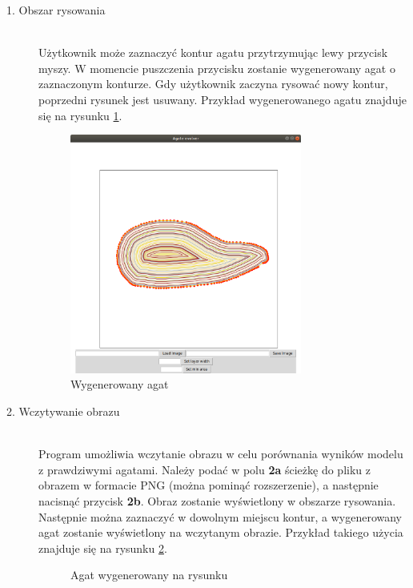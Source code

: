 \documentclass{article}
\begin{document}
\begin{description}
\item[1. Obszar rysowania] \hfill \\
Użytkownik może zaznaczyć kontur agatu przytrzymując lewy przycisk myszy. W momencie puszczenia przycisku zostanie wygenerowany agat o zaznaczonym konturze. Gdy użytkownik zaczyna rysować nowy kontur, poprzedni rysunek jest usuwany. Przykład wygenerowanego agatu znajduje się na rysunku \ref{wygenerowany_agat}.
\begin{figure}[H]
\caption{Wygenerowany agat}
\label{wygenerowany_agat}
\centering
\includegraphics[width=0.75\textwidth]{obrazy/wygenerowany_agat.png}
\end{figure}
\item[2. Wczytywanie obrazu] \hfill \\
Program umożliwia wczytanie obrazu w celu porównania wyników modelu z prawdziwymi agatami. Należy podać w polu \textbf{2a} ścieżkę do pliku z obrazem w formacie PNG (można pominąć rozszerzenie), a następnie nacisnąć przycisk \textbf{2b}. Obraz zostanie wyświetlony w obszarze rysowania. Następnie można zaznaczyć w dowolnym miejscu kontur, a wygenerowany agat zostanie wyświetlony na wczytanym obrazie. Przykład takiego użycia znajduje się na rysunku \ref{agat_wygenerowany_na_rysunku}.
\begin{figure}[H]
\caption{Agat wygenerowany na rysunku}
\label{agat_wygenerowany_na_rysunku}
\centering

\end{figure}
\end{description}
\end{document}
